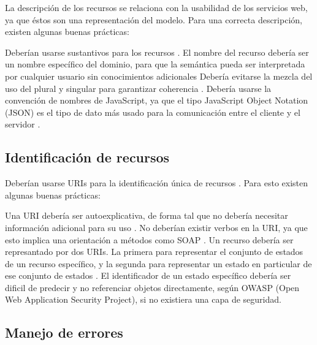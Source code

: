 La descripción de los recursos se relaciona con la usabilidad de los servicios web, ya que éstos son una representación del modelo. Para una correcta descripción, existen algunas buenas prácticas:
\begin{outline}
    \1 Deberían usarse sustantivos para los recursos \cite{WAPID}.
    \1 El nombre del recurso debería ser un nombre específico del dominio, para que la semántica pueda ser interpretada por cualquier usuario sin conocimientos adicionales \cite{WAPID}
    \1 Debería evitarse la mezcla del uso del plural y singular para garantizar coherencia \cite{WAPID}.
    \1 Debería usarse la convención de nombres de JavaScript, ya que el tipo JavaScript Object Notation (JSON) es el tipo de dato más usado para la comunicación entre el cliente y el servidor \cite{WAPID}.
\end{outline}
\subsection[Identificación de recursos]{Identificación de recursos}

Deberían usarse URIs para la identificación única de recursos \cite{ASDNB}. Para esto existen algunas buenas prácticas:
\begin{outline}
    \1 Una URI debería ser autoexplicativa, de forma tal que no debería necesitar información adicional para su uso \cite{WAPID}.
    \1 No deberían existir verbos en la URI, ya que esto implica una orientación a métodos como SOAP \cite{WAPID}.
    \1 Un recurso debería ser represantado por dos URIs. La primera para representar el conjunto de estados de un recurso específico, y la segunda para representar un estado en particular de ese conjunto de estados \cite{WAPID}.
    \1 El identificador de un estado específico debería ser dificil de predecir y no referenciar objetos directamente, según OWASP (Open Web Application Security Project), si no existiera una capa de seguridad.
\end{outline}

\subsection[Manejo de errores]{Manejo de errores}

